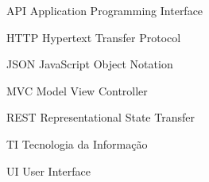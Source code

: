 
\begin{siglas}
 \item[API] Application Programming Interface
 \item[HTTP] Hypertext Transfer Protocol
 \item[JSON] JavaScript Object Notation
 \item[MVC] Model View Controller
 \item[REST] Representational State Transfer
 \item[TI] Tecnologia da Informação
 \item[UI] User Interface
\end{siglas}

